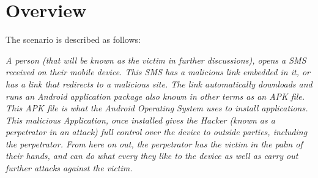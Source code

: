 \documentclass[a4paper, 12pt, titlepage]{report}
\begin{document}
\section{Overview}
The scenario is described as follows:
\begin{displayquote}
\textit{A person (that will be known as the victim in further discussions), opens a SMS received on their mobile device. This SMS has a malicious link embedded in it, or has a link that redirects to a malicious site. The link automatically downloads and runs an Android application package also known in other terms as an APK file. This APK file is what the Android Operating System uses to install applications. This malicious Application, once installed gives the Hacker (known as a perpetrator in an attack) full control over the device to outside parties, including the perpetrator. From here on out, the perpetrator has the victim in the palm of their hands, and can do what every they like to the device as well as carry out further attacks against the victim.}
\end{displayquote}
\end{document}
